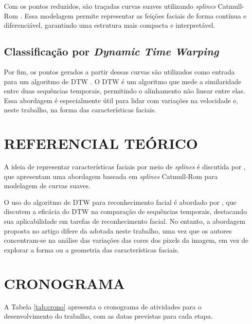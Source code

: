 Com os pontos reduzidos, são traçadas curvas suaves utilizando \textit{splines} Catmull-Rom \cite{CatmullRom, CatRomDemonstration, RepresentationSplines}. Essa modelagem permite representar as feições faciais de forma contínua e diferenciável, garantindo uma estrutura mais compacta e interpretável.

\subsection{Classificação por \textit{Dynamic Time Warping}}

Por fim, os pontos gerados a partir dessas curvas são utilizados como entrada para um algoritmo de DTW \cite{SAKOE, tavenard.blog.dtw}. O DTW é um algoritmo que mede a similaridade entre duas sequências temporais, permitindo o alinhamento não linear entre elas. Essa abordagem é especialmente útil para lidar com variações na velocidade e, neste trabalho, na forma das características faciais.

\section{REFERENCIAL TEÓRICO}

A ideia de representar características faciais por meio de \textit{splines} é discutida por \citet{RepresentationSplines}, que apresentam uma abordagem baseada em \textit{splines} Catmull-Rom para modelagem de curvas suaves. 

O uso do algoritmo de DTW para reconhecimento facial é abordado por \citet{DTW_LSTM}, que discutem a eficácia do DTW na comparação de sequências temporais, destacando sua aplicabilidade em tarefas de reconhecimento facial. No entanto, a abordagem proposta no artigo difere da adotada neste trabalho, uma vez que os autores concentram-se na análise das variações das cores dos pixels da imagem, em vez de explorar a forma ou a geometria das características faciais.

\section{CRONOGRAMA}

A Tabela \ref{tab:crono} apresenta o cronograma de atividades para o desenvolvimento do trabalho, com as datas previstas para cada etapa.

